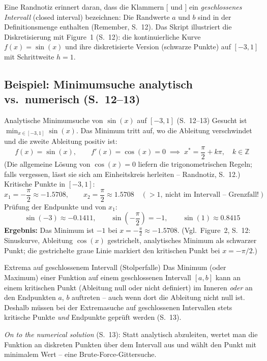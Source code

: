 Eine Randnotiz erinnert daran, dass die Klammern $[$ und $]$ ein \emph{geschlossenes Intervall} (closed interval) bezeichnen: Die Randwerte $a$ und $b$ sind in der Definitionsmenge enthalten (Remember, S.~12). Das Skript illustriert die Diskretisierung mit Figure~1 (S.~12): die kontinuierliche Kurve $f(x) = \sin(x)$ und ihre diskretisierte Version (schwarze Punkte) auf $[-3, 1]$ mit Schrittweite $h = 1$.

\subsection{Beispiel: Minimumsuche analytisch vs.\ numerisch (S.~12--13)}

\begin{bspbox}{Analytische Minimumsuche von $\sin(x)$ auf $[-3,1]$ (S.~12--13)}
Gesucht ist $\min_{x \in [-3,1]} \sin(x)$. Das Minimum tritt auf, wo die Ableitung verschwindet und die zweite Ableitung positiv ist:
\[
f(x) = \sin(x), \qquad f'(x) = \cos(x) = 0 \;\implies\; x^* = \frac{\pi}{2} + k\pi, \quad k \in \mathbb{Z}
\]
(Die allgemeine Lösung von $\cos(x)=0$ liefern die trigonometrischen Regeln; falls vergessen, lässt sie sich am Einheitskreis herleiten -- Randnotiz, S.~12.)
Kritische Punkte in $[-3,1]$:
\[
x_1 = -\frac{\pi}{2} \approx -1.5708, \qquad
x_2 = \frac{\pi}{2} \approx 1.5708 \quad (> 1,\ \text{nicht im Intervall -- Grenzfall!})
\]
Prüfung der Endpunkte und von $x_1$:
\[
\sin(-3) \approx -0.1411, \qquad \sin\!\left(-\frac{\pi}{2}\right) = -1, \qquad \sin(1) \approx 0.8415
\]
\textbf{Ergebnis:} Das Minimum ist $-1$ bei $x = -\frac{\pi}{2} \approx -1.5708$. (Vgl.\ Figure~2, S.~12: Sinuskurve, Ableitung $\cos(x)$ gestrichelt, analytisches Minimum als schwarzer Punkt; die gestrichelte graue Linie markiert den kritischen Punkt bei $x=-\pi/2$.)
\end{bspbox}

\begin{defbox}{Extrema auf geschlossenem Intervall (Stolperfalle)}
Das Minimum (oder Maximum) einer Funktion auf einem geschlossenen Intervall $[a,b]$ kann an einem kritischen Punkt (Ableitung null oder nicht definiert) im Inneren \emph{oder} an den Endpunkten $a$, $b$ auftreten -- auch wenn dort die Ableitung nicht null ist. Deshalb müssen bei der Extremasuche auf geschlossenen Intervallen stets kritische Punkte \emph{und} Endpunkte geprüft werden (S.~13).
\end{defbox}

\emph{On to the numerical solution} (S.~13): Statt analytisch abzuleiten, wertet man die Funktion an diskreten Punkten über dem Intervall aus und wählt den Punkt mit minimalem Wert -- eine Brute-Force-Gittersuche.

